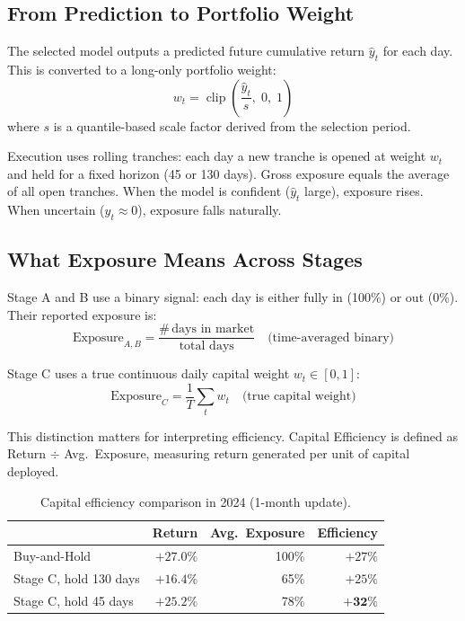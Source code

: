 \documentclass[11pt, letterpaper]{article}
\begin{document}
\subsection{From Prediction to Portfolio Weight}

The selected model outputs a predicted future cumulative return $\hat{y}_t$ for
each day. This is converted to a long-only portfolio weight:
\[
  w_t = \operatorname{clip}\!\left(\frac{\hat{y}_t}{s},\; 0,\; 1\right)
\]
where $s$ is a quantile-based scale factor derived from the selection period.

Execution uses rolling tranches: each day a new tranche is opened at weight $w_t$
and held for a fixed horizon (45 or 130 days). Gross exposure equals the average
of all open tranches. When the model is confident ($\hat{y}_t$ large), exposure
rises. When uncertain ($\hat{y}_t \approx 0$), exposure falls naturally.

\subsection{What Exposure Means Across Stages}

Stage A and B use a binary signal: each day is either fully in (100\%) or out
(0\%). Their reported exposure is:
\[
  \text{Exposure}_{A,B} = \frac{\#\,\text{days in market}}{\text{total days}}
  \quad \text{(time-averaged binary)}
\]

Stage C uses a true continuous daily capital weight $w_t \in [0, 1]$:
\[
  \text{Exposure}_C = \frac{1}{T}\sum_t w_t
  \quad \text{(true capital weight)}
\]

This distinction matters for interpreting efficiency. Capital Efficiency is defined
as Return $\div$ Avg.\ Exposure, measuring return generated per unit of capital
deployed.

\begin{table}[h]
\centering
\caption{Capital efficiency comparison in 2024 (1-month update).}
\label{tab:efficiency}
\begin{tabular}{lrrr}
\toprule
                        & Return   & Avg.\ Exposure & Efficiency \\
\midrule
Buy-and-Hold            & $+27.0\%$ & 100\%          & $+27\%$ \\
Stage C, hold 130 days  & $+16.4\%$ &  65\%          & $+25\%$ \\
Stage C, hold 45 days   & $+25.2\%$ &  78\%          & $\mathbf{+32\%}$ \\
\bottomrule
\end{tabular}
\end{table}
\end{document}
